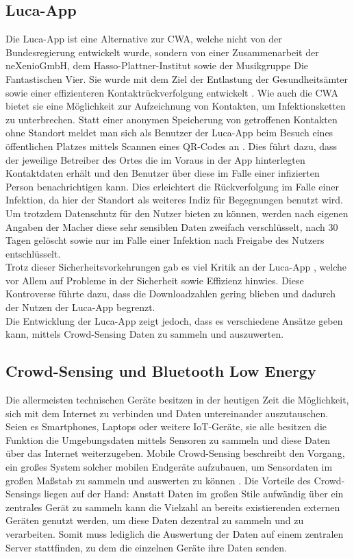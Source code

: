 \documentclass[conference,compsoc]{IEEEtran}
\begin{document}
\subsection{Luca-App}
Die Luca-App ist eine Alternative zur CWA, welche nicht von der Bundesregierung entwickelt wurde, sondern von einer Zusammenarbeit der neXenioGmbH, 
dem Hasso-Plattner-Institut sowie der Musikgruppe \glqq Die Fantastischen Vier\grqq. Sie wurde mit dem Ziel der Entlastung der Gesundheitsämter sowie einer 
effizienteren Kontaktrückverfolgung entwickelt \cite{LucaApp}. Wie auch die CWA bietet sie eine Möglichkeit zur Aufzeichnung von Kontakten, 
um Infektionsketten zu unterbrechen. Statt einer anonymen Speicherung von getroffenen Kontakten ohne Standort meldet man sich als Benutzer der Luca-App beim Besuch eines öffentlichen Platzes
mittels Scannen eines QR-Codes an \cite{LucaAppKontaktverfolgung}. Dies führt dazu, dass der jeweilige Betreiber des Ortes die im Voraus in der App hinterlegten Kontaktdaten erhält und den Benutzer über diese im Falle einer infizierten Person benachrichtigen kann.
Dies erleichtert die Rückverfolgung im Falle einer Infektion, da hier der Standort als weiteres Indiz für Begegnungen benutzt wird.\\
Um trotzdem Datenschutz für den Nutzer bieten zu können, werden nach eigenen Angaben der Macher \cite{LucaAppSicherheit} diese sehr sensiblen Daten zweifach verschlüsselt, nach 30 Tagen gelöscht sowie nur im 
Falle einer Infektion nach Freigabe des Nutzers entschlüsselt.\\
Trotz dieser Sicherheitsvorkehrungen gab es viel Kritik an der Luca-App \cite{LucaKritik1} \cite{LucaKritik2}, welche vor Allem auf Probleme in der Sicherheit sowie Effizienz hinwies. 
Diese Kontroverse führte dazu, dass die Downloadzahlen gering blieben und dadurch der Nutzen der Luca-App begrenzt.\\
Die Entwicklung der Luca-App zeigt jedoch, dass es verschiedene Ansätze geben kann, mittels Crowd-Sensing Daten zu sammeln und auszuwerten.

\subsection{Crowd-Sensing und Bluetooth Low Energy}
Die allermeisten technischen Geräte besitzen in der heutigen Zeit die Möglichkeit, sich mit dem Internet zu verbinden und Daten untereinander auszutauschen.
Seien es Smartphones, Laptops oder weitere IoT-Geräte, sie alle besitzen die Funktion die Umgebungsdaten mittels Sensoren zu sammeln und diese Daten über das Internet weiterzugeben.
Mobile Crowd-Sensing beschreibt den Vorgang, ein großes System solcher mobilen Endgeräte aufzubauen, um Sensordaten im großen Maßstab zu sammeln und auswerten zu können \cite{MCS}.
Die Vorteile des Crowd-Sensings liegen auf der Hand: Anstatt Daten im großen Stile aufwändig über ein zentrales Gerät zu sammeln kann die Vielzahl an bereits existierenden externen Geräten genutzt werden, um diese Daten dezentral zu sammeln und zu verarbeiten.
Somit muss lediglich die Auswertung der Daten auf einem zentralen Server stattfinden, zu dem die einzelnen Geräte ihre Daten senden. 
\end{document}
